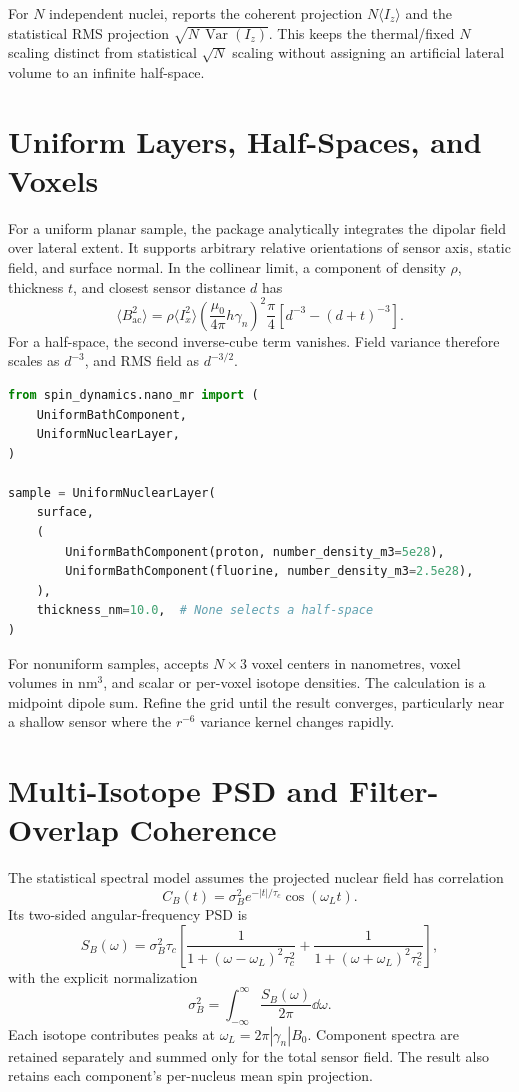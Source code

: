 For \(N\) independent nuclei,
 reports the coherent projection
\(N\langle I_z\rangle\) and the statistical RMS projection
\(\sqrt{N\,\operatorname{Var}(I_z)}\). This keeps the thermal/fixed \(N\)
scaling distinct from statistical \(\sqrt{N}\) scaling without assigning an
artificial lateral volume to an infinite half-space.

\section{Uniform Layers, Half-Spaces, and Voxels}

For a uniform planar sample, the package analytically integrates the dipolar
field over lateral extent. It supports arbitrary relative orientations of
sensor axis, static field, and surface normal. In the collinear limit, a
component of density \(\rho\), thickness \(t\), and closest sensor distance
\(d\) has
\[
  \langle B_\mathrm{ac}^2\rangle
  =\rho\langle I_x^2\rangle
   \left(\frac{\mu_0}{4\pi}h\gamma_n\right)^2
   \frac{\pi}{4}
   \left[d^{-3}-(d+t)^{-3}\right].
\]
For a half-space, the second inverse-cube term vanishes. Field variance
therefore scales as \(d^{-3}\), and RMS field as \(d^{-3/2}\).

\begin{lstlisting}[language=Python]
from spin_dynamics.nano_mr import (
    UniformBathComponent,
    UniformNuclearLayer,
)

sample = UniformNuclearLayer(
    surface,
    (
        UniformBathComponent(proton, number_density_m3=5e28),
        UniformBathComponent(fluorine, number_density_m3=2.5e28),
    ),
    thickness_nm=10.0,  # None selects a half-space
)
\end{lstlisting}

For nonuniform samples,  accepts \(N\times3\) voxel
centers in nanometres, voxel volumes in \(\mathrm{nm}^3\), and scalar or
per-voxel isotope densities. The calculation is a midpoint dipole sum. Refine
the grid until the result converges, particularly near a shallow sensor where
the \(r^{-6}\) variance kernel changes rapidly.

\section{Multi-Isotope PSD and Filter-Overlap Coherence}

The statistical spectral model assumes the projected nuclear field has correlation
\[
  C_B(t)=\sigma_B^2e^{-|t|/\tau_c}\cos(\omega_Lt).
\]
Its two-sided angular-frequency PSD is
\[
  S_B(\omega)=\sigma_B^2\tau_c
  \left[
    \frac{1}{1+(\omega-\omega_L)^2\tau_c^2}
    +\frac{1}{1+(\omega+\omega_L)^2\tau_c^2}
  \right],
\]
with the explicit normalization
\[
  \sigma_B^2=\int_{-\infty}^{\infty}
  \frac{S_B(\omega)}{2\pi}\dd\omega.
\]
Each isotope contributes peaks at
\(\omega_L=2\pi|\gamma_n|B_0\). Component spectra are retained separately and
summed only for the total sensor field. The result also retains each
component's per-nucleus mean spin projection.

